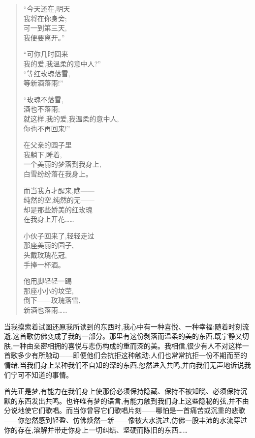 \begin{quote}\raggedright
“今天还在,明天\\
我将在你身旁;\\
可一到第三天,\\
我便要离开。”\par\medskip
“可你几时回来\\
我的爱,我温柔的意中人?”\\
“等红玫瑰落雪,\\
等新酒落雨!”\par\medskip
“玫瑰不落雪,\\
酒也不落雨;\\
就这样,我的爱,我温柔的意中人,\\
你也不再回来!”\par\medskip
在父亲的园子里\\
我躺下,睡着,\\
一个美丽的梦落到我身上,\\
白雪纷纷落在我身上。\par\medskip
\dmark{}而当我方才醒来,瞧——\\
纯然的空,纯然的无——\\
却是那些娇美的红玫瑰\\
在我身上开花……\par\medskip
小伙子回来了,轻轻走过\\
那座美丽的园子,\\
头戴玫瑰花冠,\\
手捧一杯酒。\par
\newpage
他用脚轻轻一踢\\
那座小小的坟茔,\\
倒下——玫瑰落雪,\\
新酒也落雨……
\end{quote}

当我摸索着试图还原我所读到的东西时,我心中有一种喜悦、一种幸福:随着时刻流逝,这首歌仿佛变成了我的一部分。那里有这份剥落而温柔的美的东西,既宁静又切肤,一种由亲密相拥的喜悦与悲伤构成的重而深的美。我相信,很少有人不对这样一首歌多少有所触动——即便他们会抗拒这种触动;人们也常常抗拒一份不期而至的情绪,当我们身上某种我们不自知的深的东西,忽然进入共鸣,并向我们无声地诉说我们宁可不知道的事情。

首先正是梦,有能力在我们身上使那份必须保持隐藏、保持不被知晓、必须保持沉默的东西发出共鸣。也许唯有梦的语言,有能力触到我们身上这些隐秘的弦,并不由分说地使它们歌唱。而当你曾容它们歌唱片刻——哪怕是一首痛苦或沉重的悲歌——你忽然感到轻盈、仿佛焕然一新——像被大水洗过,仿佛一股丰沛的水流穿过你的存在,溶解并带走你身上一切纠结、坚硬而陈旧的东西……


